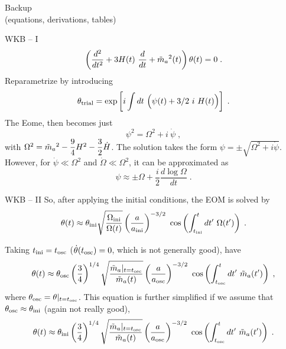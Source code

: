 \documentclass[10pt,utf8,compress,xcolor=dvipsnames]{beamer}
\begin{document}
\begin{frame}[noframenumbering]
	\begin{center}
		{\color{yellow} \Huge Backup \\ {\tiny (equations, derivations, tables)}}
	\end{center}
\end{frame}
%

\begin{frame}{WKB -- I}
	\begin{equation*}
		\left( \dfrac{d^2}{d t^2} + 3 H(t) \ \dfrac{d}{d t} + \tilde m_{a}{}^2(t)  \right) \theta(t) = 0 \; .
	\end{equation*}
	Reparametrize by introducing
	\begin{equation*}
		\theta_{\rm trial} = \exp\left[  i \displaystyle \int d t \ \Big( \psi(t) +3/2 \ i \ H(t) \Big)  \right] \;.
	\end{equation*}
	The Eome, then becomes just
	\begin{equation*}
		\psi^2 = \Omega^2 + i \ \dot \psi \; ,
	\end{equation*}
	with $\Omega^2 = \tilde m_{a}{}^2 - \dfrac{9}{4} H^2 -  \dfrac{3}{2} \dot H $.
	The solution takes the form $\psi = \pm \sqrt{\Omega^2 + i \dot \psi}$. However, for $\dot \psi \ll \Omega^2$ and $\dot \Omega \ll \Omega^2$, it can be approximated as
	\begin{equation*}
		\psi \approx \pm \Omega + \dfrac{i}{2} \dfrac{d \log \Omega}{d t} \;.
	\end{equation*}
\end{frame}

\begin{frame}{WKB -- II}
	So, after applying the initial conditions, the EOM is solved by
	\begin{equation*}
		\theta(t) \approx \thetai \sqrt{ \dfrac{ \Omegai }{\Omega (t)} } \lrb{\dfrac{a}{\ai}}^{-3/2} \  \cos\lrb{ \int_{\ti}^t d t^\prime  \ \Omega(t^\prime)}   \;.
	\end{equation*}
	
	Taking  $t_{\rm ini}{} = t_{\rm osc}{}$ (\ie $\dot \theta(t_{\rm osc}{}) = 0$, which is not generally good), have
	\begin{equation*}
		\theta(t) \approx \theta_{\rm osc}{} \left( \dfrac{3}{4} \right)^{1/4} \sqrt{ \dfrac{ \tilde m_{a}{}|_{t=t_{\rm osc}{}} }{\tilde m_{a}{}  (t)} } \left( \dfrac{a}{a_{\rm osc}{}} \right)^{-3/2} \  \cos\left(  \int_{t_{\rm osc}{}}^t d t^\prime  \ \tilde m_{a}{}(t^\prime) \right)   \;,
	\end{equation*}
	where $\theta_{\rm osc}{} = \theta|_{t=t_{\rm osc}{}}$. This equation is further simplified if we assume that $\theta_{\rm osc}{} \approx \theta_{\rm ini}{}$ (again not really good), \ie
	\begin{equation*}
		\theta(t) \approx \thetai \lrb{\dfrac{3}{4}}^{1/4} \sqrt{ \dfrac{ \maT|_{t=\tosc} }{\maT  (t)} } \lrb{\dfrac{a}{\aosc}}^{-3/2} \  \cos\lrb{ \int_{\tosc}^t d t^\prime  \ \maT(t^\prime)}   \;.
	\end{equation*}
	
	
\end{frame}
\end{document}
